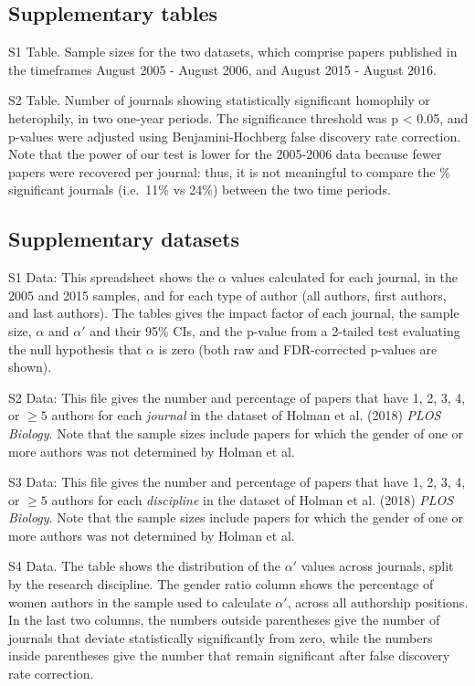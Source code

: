 \documentclass[12pt,]{article}
\begin{document}
\subsection{Supplementary tables}\label{supplementary-tables}

S1 Table. Sample sizes for the two datasets, which comprise papers
published in the timeframes August 2005 - August 2006, and August 2015 -
August 2016.

S2 Table. Number of journals showing statistically significant homophily
or heterophily, in two one-year periods. The significance threshold was
p \textless{} 0.05, and p-values were adjusted using Benjamini-Hochberg
false discovery rate correction. Note that the power of our test is
lower for the 2005-2006 data because fewer papers were recovered per
journal: thus, it is not meaningful to compare the \% significant
journals (i.e.~11\% vs 24\%) between the two time periods.

\subsection{Supplementary datasets}\label{supplementary-datasets}

S1 Data: This spreadsheet shows the \(\alpha\) values calculated for
each journal, in the 2005 and 2015 samples, and for each type of author
(all authors, first authors, and last authors). The tables gives the
impact factor of each journal, the sample size, \(\alpha\) and
\(\alpha'\) and their 95\% CIs, and the p-value from a 2-tailed test
evaluating the null hypothesis that \(\alpha\) is zero (both raw and
FDR-corrected p-values are shown).

S2 Data: This file gives the number and percentage of papers that have
1, 2, 3, 4, or \({\ge}5\) authors for each \emph{journal} in the dataset
of Holman et al. (2018) \emph{PLOS Biology}. Note that the sample sizes
include papers for which the gender of one or more authors was not
determined by Holman et al.

S3 Data: This file gives the number and percentage of papers that have
1, 2, 3, 4, or \({\ge}5\) authors for each \emph{discipline} in the
dataset of Holman et al. (2018) \emph{PLOS Biology}. Note that the
sample sizes include papers for which the gender of one or more authors
was not determined by Holman et al.

S4 Data. The table shows the distribution of the \(\alpha'\) values
across journals, split by the research discipline. The gender ratio
column shows the percentage of women authors in the sample used to
calculate \(\alpha'\), across all authorship positions. In the last two
columns, the numbers outside parentheses give the number of journals
that deviate statistically significantly from zero, while the numbers
inside parentheses give the number that remain significant after false
discovery rate correction.
\end{document}
